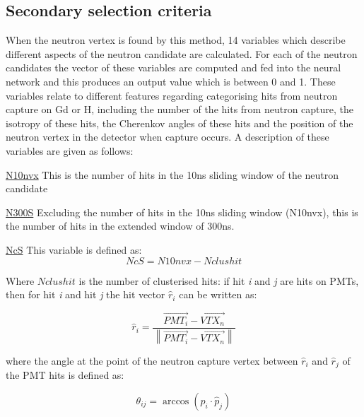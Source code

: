 \documentclass{article}
\begin{document}
\subsection{Secondary selection criteria}
When the neutron vertex is found by this method, 14 variables which describe different aspects of the neutron candidate are calculated. For each of the neutron candidates the vector of these variables are computed and fed into the neural network and this produces an output value which is between 0 and 1. These variables relate to different features regarding categorising hits from neutron capture on Gd or H, including the number of the hits from neutron capture, the isotropy of these hits, the Cherenkov angles of these hits and the position of the neutron vertex in the detector when capture occurs. A description of these variables are given as follows:
\newline


\underline{N10nvx}
\newline
This is the number of hits in the 10ns sliding window of the neutron candidate
\newline


\underline{N300S}
\newline
Excluding the number of hits in the 10ns sliding window (N10nvx), this is the number of hits in the extended window of 300ns.
\newline


\underline{NcS}
\newline
This variable is defined as:
\begin{equation}
\label{ncs}
    NcS = N10nvx - Nclushit
\end{equation}

    Where $Nclushit$ is the number of clusterised hits: if hit \textit{i} and \textit{j} are hits on PMTs, then for hit \textit{i} and hit \textit{j} the hit vector $\hat{r}_i$ can be written as:

\begin{equation}
\label{hit}
    \hat{r}_{i}=\frac{\overrightarrow{P M T_{i}}-\overrightarrow{V T X_{n}}}{\left\|\overrightarrow{P M T_{i}}-\overrightarrow{V T X_{n}}\right\|}
\end{equation}

where the angle at the point of the neutron capture vertex between $\hat{r}_{i}$ and $\hat{r}_{j}$ of the PMT hits is defined as:

\begin{equation}
\theta_{i j}=\arccos \left(\hat{p}_{i} \cdot \hat{p}_{j}\right)
\end{equation}
\end{document}
